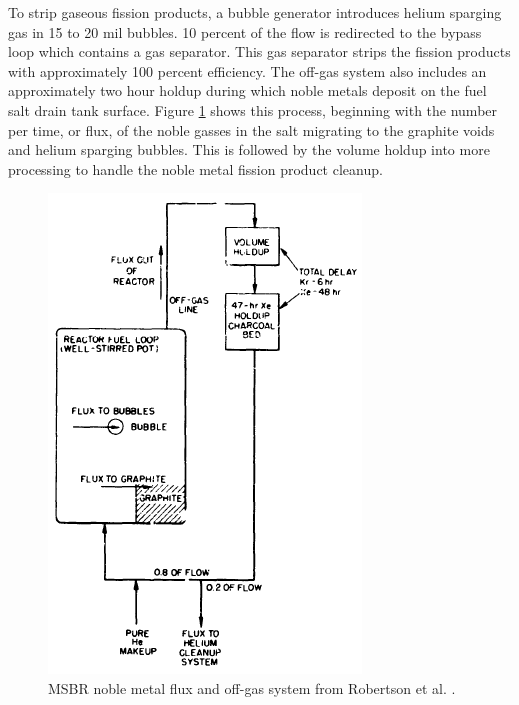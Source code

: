 To strip gaseous fission products, a bubble generator introduces helium sparging gas in 15 to 20 mil bubbles. 10 percent of the flow is redirected to the bypass loop which contains a gas separator. This gas separator strips the fission products with approximately 100 percent efficiency. The off-gas system also includes an approximately two hour holdup during which noble metals deposit on the fuel salt drain tank surface. Figure \ref{fig:msbr_nm_pa} shows this process, beginning with the number per time, or flux, of the noble gasses in the salt migrating to the graphite voids and helium sparging bubbles. This is followed by the volume holdup into more processing to handle the noble metal fission product cleanup.

\begin{figure}[H]
  \centering
  \includegraphics[scale=0.65]{images/msbr_nm_robertson.PNG}
  \caption{MSBR noble metal flux and off-gas system from Robertson et al. \cite{robertson_conceptual_1971}.}
   \label{fig:msbr_nm_pa}
\end{figure}



